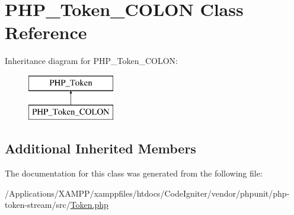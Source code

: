 \hypertarget{class_p_h_p___token___c_o_l_o_n}{}\section{P\+H\+P\+\_\+\+Token\+\_\+\+C\+O\+L\+ON Class Reference}
\label{class_p_h_p___token___c_o_l_o_n}
Inheritance diagram for P\+H\+P\+\_\+\+Token\+\_\+\+C\+O\+L\+ON\+:\begin{figure}[H]
\begin{center}
\leavevmode
\includegraphics[height=2.000000cm]{class_p_h_p___token___c_o_l_o_n}
\end{center}
\end{figure}
\subsection*{Additional Inherited Members}


The documentation for this class was generated from the following file\+:\begin{DoxyCompactItemize}
\item 
/\+Applications/\+X\+A\+M\+P\+P/xamppfiles/htdocs/\+Code\+Igniter/vendor/phpunit/php-\/token-\/stream/src/\mbox{\hyperlink{_token_8php}{Token.\+php}}\end{DoxyCompactItemize}
